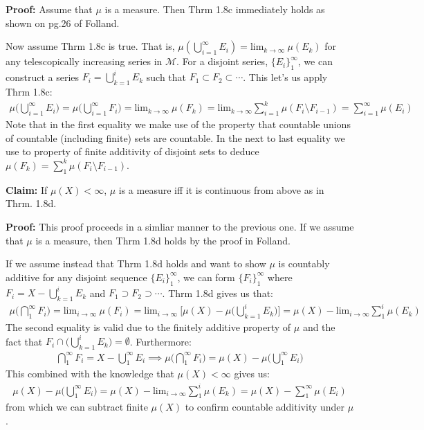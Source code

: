 \documentclass[11pt,letter]{article}
\begin{document}
\begin{enumerate}
    \textbf{Proof:} Assume that $\mu$ is a measure. Then Thrm 1.8c immediately holds as shown on pg.26 of Folland.

    Now assume Thrm 1.8c is true. That is, $\mu ( \bigcup_{i=1}^\infty E_i ) = \text{lim}_{k \rightarrow \infty} \ \mu(E_k)$ for any telescopically increasing series in $\mathcal{M}$. For a disjoint series, $\{E_i\}_1^\infty$, we can construct a series $F_i = \bigcup_{k=1}^i E_k$ such that $F_1 \subset F_2 \subset \cdots$. This let's us apply Thrm 1.8c:
    \begin{align*}
        \mu \Big( \bigcup\limits_{i=1}^\infty E_i \Big) = \mu \Big( \bigcup\limits_{i=1}^\infty F_i \Big) = \text{lim}_{k \rightarrow \infty} \ \mu(F_k) = \text{lim}_{k \rightarrow \infty} \sum\limits_{i=1}^k \mu(F_i \setminus F_{i-1}) = \sum\limits_{i=1}^\infty \mu(E_i)
    \end{align*}
    Note that in the first equality we make use of the property that countable unions of countable (including finite) sets are countable. In the next to last equality we use to property of finite additivity of disjoint sets to deduce $\mu(F_k) = \sum_1^k \mu(F_i \setminus F_{i-1})$.

    \textbf{Claim:} If $\mu(X) < \infty$, $\mu$ is a measure iff it is continuous from above as in Thrm. 1.8d.

    \textbf{Proof:} This proof proceeds in a simliar manner to the previous one. If we assume that $\mu$ is a measure, then Thrm 1.8d holds by the proof in Folland.

    If we assume instead that Thrm 1.8d holds and want to show $\mu$ is countably additive for any disjoint sequence $\{E_i\}_1^\infty$, we can form $\{F_i\}_1^\infty$ where $F_i = X - \bigcup_{k=1}^i E_k$ and $F_1 \supset F_2 \supset \cdots$. Thrm 1.8d gives us that:
    \begin{align*}
        \mu \Big( \bigcap\limits_{1}^\infty F_i \Big) = \text{lim}_{i \rightarrow \infty} \ \mu(F_i) = \text{lim}_{i \rightarrow \infty} \ \big[\mu(X) - \mu \Big(\bigcup\limits_{k=1}^i E_k\Big)\big] = \mu(X) - \text{lim}_{i \rightarrow \infty} \sum\limits_1^i \mu(E_k)
    \end{align*}
    The second equality is valid due to the finitely additive property of $\mu$ and the fact that $F_i \cap \big(\bigcup_{k=1}^i E_k \big)= \emptyset$. Furthermore:
    \begin{align*}
        \bigcap\limits_1^\infty F_i = X - \bigcup\limits_1^\infty E_i \implies \mu\Big( \bigcap\limits_1^\infty F_i \Big) = \mu(X) - \mu\Big(\bigcup\limits_1^\infty E_i \Big)
    \end{align*}
    This combined with the knowledge that $\mu(X) < \infty$ gives us:
    \begin{align*}
        \mu(X) - \mu\Big(\bigcup\limits_1^\infty E_i \Big) = \mu(X) - \text{lim}_{i \rightarrow \infty} \sum\limits_1^i \mu(E_k) = \mu(X) - \sum\limits_1^\infty \mu(E_i)
    \end{align*}
    from which we can subtract finite $\mu(X)$ to confirm countable additivity under $\mu$.


\end{enumerate}
\end{document}
